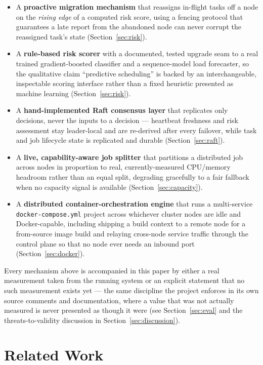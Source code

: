\documentclass[conference]{IEEEtran}
\begin{document}
\begin{itemize}
\item A \textbf{proactive migration mechanism} that reassigns in-flight tasks off a node on the
  \emph{rising edge} of a computed risk score, using a fencing protocol that guarantees a late report
  from the abandoned node can never corrupt the reassigned task's state (Section~\ref{sec:risk}).
\item A \textbf{rule-based risk scorer} with a documented, tested upgrade seam to a real trained
  gradient-boosted classifier and a sequence-model load forecaster, so the qualitative claim
  ``predictive scheduling'' is backed by an interchangeable, inspectable scoring interface rather than
  a fixed heuristic presented as machine learning (Section~\ref{sec:risk}).
\item A \textbf{hand-implemented Raft consensus layer} that replicates only decisions, never the
  inputs to a decision — heartbeat freshness and risk assessment stay leader-local and are re-derived
  after every failover, while task and job lifecycle state is replicated and durable
  (Section~\ref{sec:raft}).
\item A \textbf{live, capability-aware job splitter} that partitions a distributed job across nodes in
  proportion to real, currently-measured CPU/memory headroom rather than an equal split, degrading
  gracefully to a fair fallback when no capacity signal is available (Section~\ref{sec:capacity}).
\item A \textbf{distributed container-orchestration engine} that runs a multi-service
  \texttt{docker-compose.yml} project across whichever cluster nodes are idle and Docker-capable,
  including shipping a build context to a remote node for a from-source image build and relaying
  cross-node service traffic through the control plane so that no node ever needs an inbound port
  (Section~\ref{sec:docker}).
\end{itemize}

Every mechanism above is accompanied in this paper by either a real measurement taken from the running
system or an explicit statement that no such measurement exists yet — the same discipline the project
enforces in its own source comments and documentation, where a value that was not actually measured is
never presented as though it were (see Section~\ref{sec:eval} and the threats-to-validity discussion
in Section~\ref{sec:discussion}).

\section{Related Work}
\label{sec:related}
\end{document}
